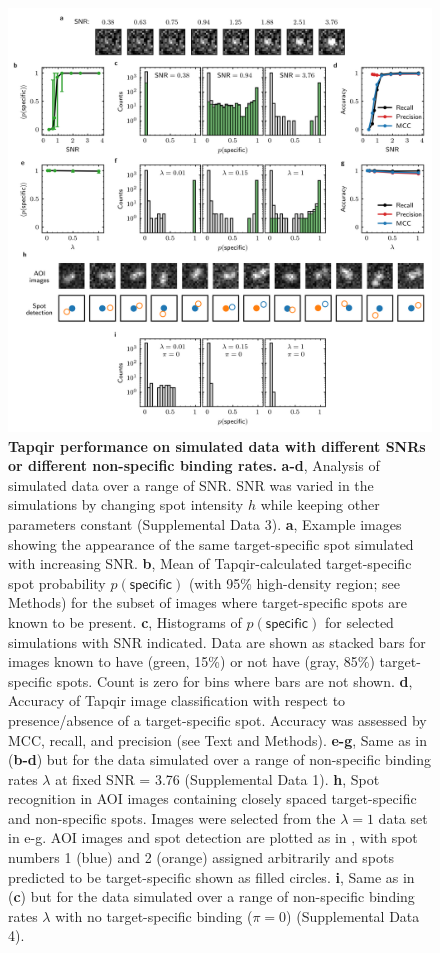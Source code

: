 \begin{figure}
\begin{fullwidth}
\includegraphics[width=183mm]{figures/figure5.png}
\caption{\textbf{Tapqir performance on simulated data with different SNRs or different non-specific binding rates.} \textbf{a-d}, Analysis of simulated data over a range of SNR. SNR was varied in the simulations by changing spot intensity  $h$ while keeping other parameters constant (Supplemental Data 3). \textbf{a}, Example images showing the appearance of the same target-specific spot simulated with increasing SNR.   \textbf{b}, Mean of Tapqir-calculated target-specific spot probability $p(\mathsf{specific})$ (with 95\% high-density region; see Methods) for the subset of images where target-specific spots  are known to be present. \textbf{c}, Histograms of $p(\mathsf{specific})$ for selected simulations with SNR indicated. Data are shown as stacked bars for images known to have (green, 15\%) or not have (gray, 85\%) target-specific spots.  Count is zero for bins where bars are not shown. \textbf{d}, Accuracy of Tapqir image classification with respect to presence/absence of a target-specific spot. Accuracy was assessed by MCC, recall, and precision (see Text and Methods). \textbf{e-g}, Same as in (\textbf{b-d}) but for the data simulated over a range of non-specific binding rates $\lambda$ at fixed SNR = 3.76 (Supplemental Data 1). \textbf{h}, Spot recognition in AOI images containing closely spaced target-specific and non-specific spots.  Images were selected from the $\lambda = 1$ data set in e-g. AOI images and spot detection are plotted as in , with spot numbers 1 (blue) and 2 (orange) assigned arbitrarily and spots predicted to be target-specific shown as filled circles. \textbf{i}, Same as in (\textbf{c}) but for the data simulated over a range of non-specific binding rates $\lambda$ with no target-specific binding ($\pi = 0$) (Supplemental Data 4).}

\end{fullwidth}
\end{figure}
